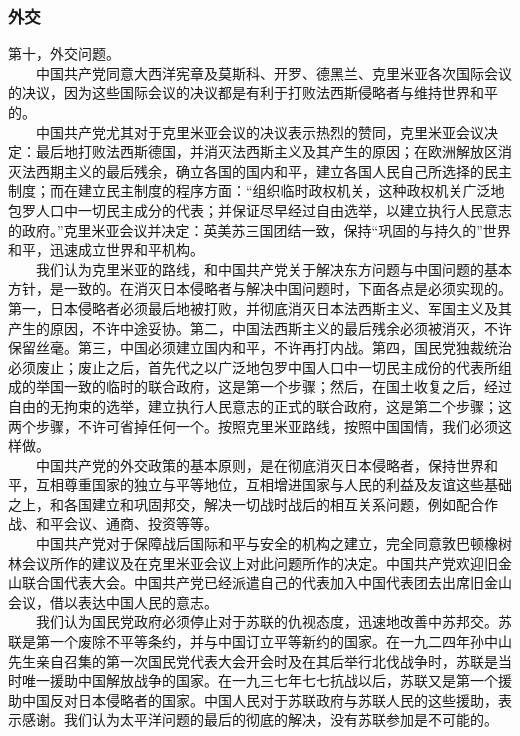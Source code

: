 \documentclass[cn,11pt,chinese]{elegantbook}
\def\myformat#1{\hfil\hfil #1}
\begin{document}
\subsubsection*{\myformat{外交}}
第十，外交问题。\\
　　中国共产党同意大西洋宪章及莫斯科、开罗、德黑兰、克里米亚各次国际会议的决议，因为这些国际会议的决议都是有利于打败法西斯侵略者与维持世界和平的。\\
　　中国共产党尤其对于克里米亚会议的决议表示热烈的赞同，克里米亚会议决定：最后地打败法西斯德国，并消灭法西斯主义及其产生的原因；在欧洲解放区消灭法西期主义的最后残余，确立各国的国内和平，建立各国人民自己所选择的民主制度；而在建立民主制度的程序方面：“组织临时政权机关，这种政权机关广泛地包罗人口中一切民主成分的代表；并保证尽早经过自由选举，以建立执行人民意志的政府。”克里米亚会议并决定：英美苏三国团结一致，保持“巩固的与持久的”世界和平，迅速成立世界和平机构。\\
　　我们认为克里米亚的路线，和中国共产党关于解决东方问题与中国问题的基本方针，是一致的。在消灭日本侵略者与解决中国问题时，下面各点是必须实现的。第一，日本侵略者必须最后地被打败，并彻底消灭日本法西斯主义、军国主义及其产生的原因，不许中途妥协。第二，中国法西斯主义的最后残余必须被消灭，不许保留丝毫。第三，中国必须建立国内和平，不许再打内战。第四，国民党独裁统治必须废止；废止之后，首先代之以广泛地包罗中国人口中一切民主成份的代表所组成的举国一致的临时的联合政府，这是第一个步骤；然后，在国土收复之后，经过自由的无拘束的选举，建立执行人民意志的正式的联合政府，这是第二个步骤；这两个步骤，不许可省掉任何一个。按照克里米亚路线，按照中国国情，我们必须这样做。\\
　　中国共产党的外交政策的基本原则，是在彻底消灭日本侵略者，保持世界和平，互相尊重国家的独立与平等地位，互相增进国家与人民的利益及友谊这些基础之上，和各国建立和巩固邦交，解决一切战时战后的相互关系问题，例如配合作战、和平会议、通商、投资等等。\\
　　中国共产党对于保障战后国际和平与安全的机构之建立，完全同意敦巴顿橡树林会议所作的建议及在克里米亚会议上对此问题所作的决定。中国共产党欢迎旧金山联合国代表大会。中国共产党已经派遣自己的代表加入中国代表团去出席旧金山会议，借以表达中国人民的意志。\\
　　我们认为国民党政府必须停止对于苏联的仇视态度，迅速地改善中苏邦交。苏联是第一个废除不平等条约，并与中国订立平等新约的国家。在一九二四年孙中山先生亲自召集的第一次国民党代表大会开会时及在其后举行北伐战争时，苏联是当时唯一援助中国解放战争的国家。在一九三七年七七抗战以后，苏联又是第一个援助中国反对日本侵略者的国家。中国人民对于苏联政府与苏联人民的这些援助，表示感谢。我们认为太平洋问题的最后的彻底的解决，没有苏联参加是不可能的。\\
\end{document}

